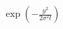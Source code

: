 \documentclass[preview]{standalone}
\begin{document}
\begin{align*}
\exp\left(-\frac{y^2}{2\sigma^2 t}\right)
\end{align*}
\end{document}
